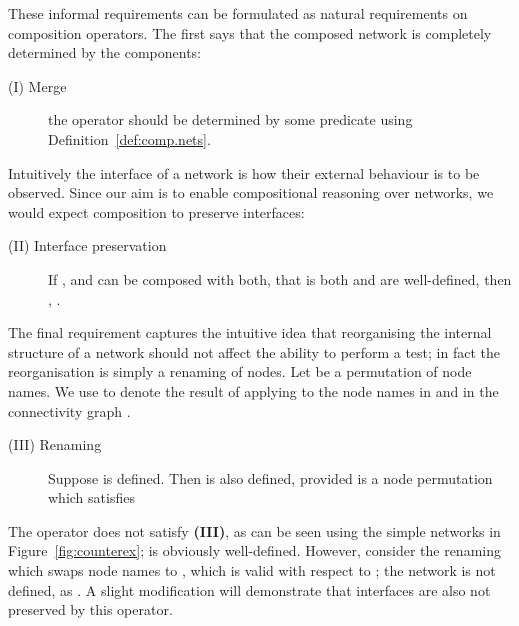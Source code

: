 \documentclass{LMCS}
\begin{document}
These informal requirements can be formulated as natural requirements on composition
operators. 
The
first says that the composed network is completely determined by the
components:
\begin{description}
\item[(I) Merge] the operator  should be determined by
  some predicate  using
  Definition~\ref{def:comp.nets}.
\end{description}

Intuitively the interface of a network is how their external behaviour
is to be observed. Since our aim is to enable 
compositional reasoning over networks, we would expect composition to preserve
interfaces:
\begin{description}
\item[(II) Interface preservation] If ,  and  can be composed with both,  that is both 
        and 
are well-defined,  then , 
      .
\end{description}

The final requirement captures the intuitive idea that reorganising
the internal structure of a network should not affect the ability to
perform a test; in fact the reorganisation is simply a renaming of
nodes. Let  be a permutation of node names. We use  to denote the result of applying  to the node
names in  and in the connectivity graph .
\begin{description}
\item[(III) Renaming] Suppose  is
  defined. Then  is also defined, provided  is a node permutation
  which satisfies
\end{description}

\begin{exa}
The operator  does not satisfy \textbf{(III)}, as can be
seen using the simple networks in Figure~\ref{fig:counterex}; 
is obviously well-defined. However, consider the renaming  which swaps node names  to , which is valid with respect to 
; the network  is not defined, as .
A slight modification will demonstrate that interfaces are also not preserved by this operator. 
\end{exa}
\end{document}
